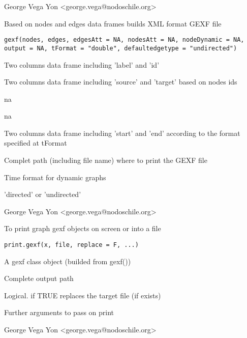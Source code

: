 \documentclass[letterpaper]{book}
\begin{document}
%
\begin{Author}\relax
George Vega Yon <george.vega@nodoschile.org>
\end{Author}
%
\begin{Description}\relax
Based on nodes and edges data frames builds XML format GEXF file
\end{Description}
%
\begin{Usage}
\begin{verbatim}
gexf(nodes, edges, edgesAtt = NA, nodesAtt = NA, nodeDynamic = NA, output = NA, tFormat = "double", defaultedgetype = "undirected")
\end{verbatim}
\end{Usage}
%
\begin{Arguments}
\begin{ldescription}
\item[\code{nodes}] Two columns data frame including 'label' and 'id'
\item[\code{edges}] Two columns data frame including 'source' and 'target' based on nodes ids
\item[\code{edgesAtt}] na
\item[\code{nodesAtt}] na
\item[\code{nodeDynamic}] Two columns data frame including 'start' and 'end' according to the format specified at tFormat
\item[\code{output}] Complet path (including file name) where to print the GEXF file
\item[\code{tFormat}] Time format for dynamic graphs
\item[\code{defaultedgetype}] 'directed' or 'undirected'
\end{ldescription}
\end{Arguments}
%
\begin{Author}\relax
George Vega Yon <george.vega@nodoschile.org>
\end{Author}
%
\begin{Description}\relax
To print graph gexf objects on screen or into a file
\end{Description}
%
\begin{Usage}
\begin{verbatim}
print.gexf(x, file, replace = F, ...)
\end{verbatim}
\end{Usage}
%
\begin{Arguments}
\begin{ldescription}
\item[\code{x}] A gexf class object (builded from gexf())
\item[\code{file}] Complete output path
\item[\code{replace}] Logical. if TRUE replaces the target file (if exists)
\item[\code{...}] Further arguments to pass on print
\end{ldescription}
\end{Arguments}
%
\begin{Author}\relax
George Vega Yon <george.vega@nodoschile.org>
\end{Author}
\printindex{}
\end{document}
